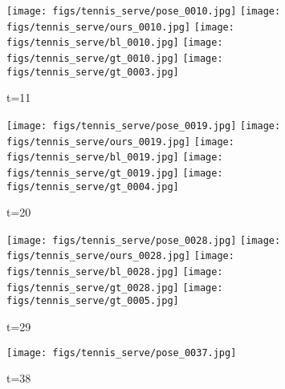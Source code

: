 \documentclass{article}
\begin{document}
\begin{figure*}[thbp]%
    \vspace{-6pt}
    \centering
	\begin{subfigure}{0.04\linewidth}
        \raggedleft
    \end{subfigure}
    \begin{subfigure}{0.12\linewidth}
        \caption*{t=11}
        \vspace{-7pt}
	    \texttt{[image: figs/tennis\_serve/pose\_0010.jpg]} 
  		\texttt{[image: figs/tennis\_serve/ours\_0010.jpg]}
  		\texttt{[image: figs/tennis\_serve/bl\_0010.jpg]}
  		\texttt{[image: figs/tennis\_serve/gt\_0010.jpg]}
  		\texttt{[image: figs/tennis\_serve/gt\_0003.jpg]}
	\end{subfigure} 
    \begin{subfigure}{0.12\linewidth}
        \caption*{t=20}
        \vspace{-7pt}
	    \texttt{[image: figs/tennis\_serve/pose\_0019.jpg]} 
  		\texttt{[image: figs/tennis\_serve/ours\_0019.jpg]}
  		\texttt{[image: figs/tennis\_serve/bl\_0019.jpg]}
  		\texttt{[image: figs/tennis\_serve/gt\_0019.jpg]}
  		\texttt{[image: figs/tennis\_serve/gt\_0004.jpg]}
	\end{subfigure} 
    \begin{subfigure}{0.12\linewidth}
        \caption*{t=29}
        \vspace{-7pt}
	    \texttt{[image: figs/tennis\_serve/pose\_0028.jpg]} 
  		\texttt{[image: figs/tennis\_serve/ours\_0028.jpg]}
  		\texttt{[image: figs/tennis\_serve/bl\_0028.jpg]}
  		\texttt{[image: figs/tennis\_serve/gt\_0028.jpg]}
  		\texttt{[image: figs/tennis\_serve/gt\_0005.jpg]}
	\end{subfigure} 
    \begin{subfigure}{0.12\linewidth}
        \caption*{t=38}
        \vspace{-7pt}
	    \texttt{[image: figs/tennis\_serve/pose\_0037.jpg]} 

\end{subfigure}
\end{figure*}
\end{document}
